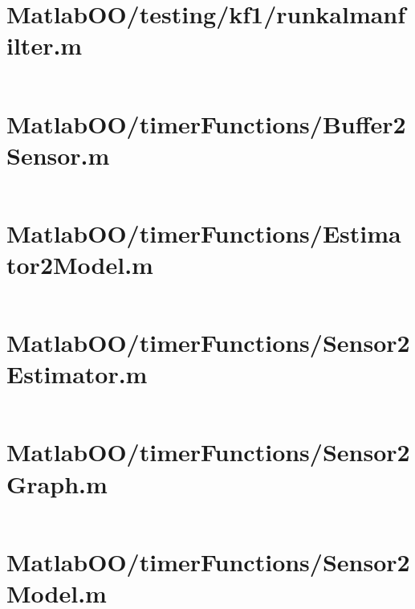 \pagebreak
\section{MatlabOO/testing/kf1/runkalmanfilter.m}\label{code:MatlabOO/testing/kf1/runkalmanfilter.m}
\inputminted[linenos,fontsize=\scriptsize]{matlab}{/home/dcouture/git/mathyourlife/TSatPy/beta_versions/matlab_object_oriented/testing/kf1/runkalmanfilter.m}

\pagebreak
\section{MatlabOO/timerFunctions/Buffer2Sensor.m}\label{code:MatlabOO/timerFunctions/Buffer2Sensor.m}
\inputminted[linenos,fontsize=\scriptsize]{matlab}{/home/dcouture/git/mathyourlife/TSatPy/beta_versions/matlab_object_oriented/timerFunctions/Buffer2Sensor.m}

\pagebreak
\section{MatlabOO/timerFunctions/Estimator2Model.m}\label{code:MatlabOO/timerFunctions/Estimator2Model.m}
\inputminted[linenos,fontsize=\scriptsize]{matlab}{/home/dcouture/git/mathyourlife/TSatPy/beta_versions/matlab_object_oriented/timerFunctions/Estimator2Model.m}

\pagebreak
\section{MatlabOO/timerFunctions/Sensor2Estimator.m}\label{code:MatlabOO/timerFunctions/Sensor2Estimator.m}
\inputminted[linenos,fontsize=\scriptsize]{matlab}{/home/dcouture/git/mathyourlife/TSatPy/beta_versions/matlab_object_oriented/timerFunctions/Sensor2Estimator.m}

\pagebreak
\section{MatlabOO/timerFunctions/Sensor2Graph.m}\label{code:MatlabOO/timerFunctions/Sensor2Graph.m}
\inputminted[linenos,fontsize=\scriptsize]{matlab}{/home/dcouture/git/mathyourlife/TSatPy/beta_versions/matlab_object_oriented/timerFunctions/Sensor2Graph.m}

\pagebreak
\section{MatlabOO/timerFunctions/Sensor2Model.m}\label{code:MatlabOO/timerFunctions/Sensor2Model.m}
\inputminted[linenos,fontsize=\scriptsize]{matlab}{/home/dcouture/git/mathyourlife/TSatPy/beta_versions/matlab_object_oriented/timerFunctions/Sensor2Model.m}

